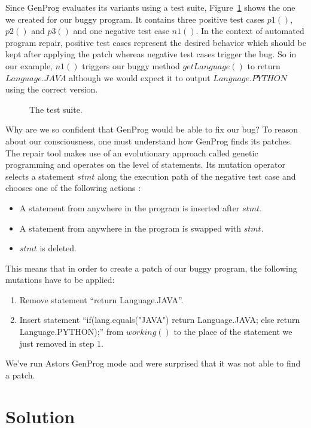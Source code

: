 \documentclass[pdftex,english,oribibl]{llncs}
\begin{document}
Since GenProg evaluates its variants using a test suite, Figure~\ref{fig:testsuite} shows the one we created for our buggy program. It contains three positive test cases $p1()$, $p2()$ and $p3()$ and one negative test case $n1()$. 
In the context of automated program repair, positive test cases represent the desired behavior which should be kept after applying the patch whereas negative test cases trigger the bug.
So in our example, $n1()$ triggers our buggy method $getLanguage()$ to return $Language.JAVA$ although we would expect it to output $Language.PYTHON$ using the correct version.

\begin{figure}
\begin{center}

\end{center}
\caption{The test suite.}
\label{fig:testsuite}
\end{figure}

Why are we so confident that GenProg would be able to fix our bug?
To reason about our consciousness, one must understand how GenProg finds its patches.
The repair tool makes use of an evolutionary approach called genetic programming and operates on the level of statements. Its mutation operator selects a statement $stmt$ along the execution path of the negative test case and chooses one of the following actions \cite{Philipp}:
\begin{itemize}
 	\item A statement from anywhere in the program is inserted after $stmt$.
 	\item A statement from anywhere in the program is swapped with $stmt$.
 	\item $stmt$ is deleted.
\end{itemize}
This means that in order to create a patch of our buggy program, the following mutations have to be applied:
\begin{enumerate}
	\item Remove statement ``return Language.JAVA''.
	\item Insert statement ``if(lang.equals("JAVA") return Language.JAVA; else return Language.PYTHON);'' from $working()$ to the place of the statement we just removed in step 1.
\end{enumerate}
We've run Astors GenProg mode and were surprised that it was not able to find a patch.

\section{Solution}\label{sec:solution}
\end{document}
